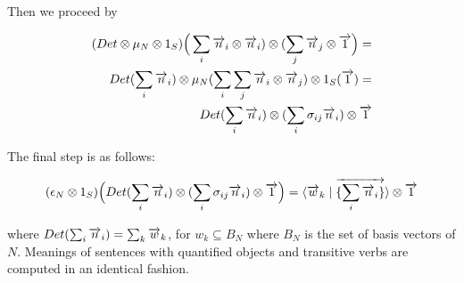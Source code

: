 \noindent
Then we proceed by

\begin{align*}
(Det \otimes  \mu_N \otimes 1_S)\Big(\sum_i \overrightarrow{n}_i \otimes \overrightarrow{n}_i) \otimes (\sum_j \overrightarrow{n}_j \otimes \overrightarrow{1}\Big) = \\
Det(\sum_i \overrightarrow{n}_i) \otimes  \mu_N(\sum_i \sum_j \overrightarrow{n}_i \otimes \overrightarrow{n}_j) \otimes 1_S(\overrightarrow{1}) = \\
Det(\sum_i \overrightarrow{n}_i) \otimes  (\sum_i \sigma_{ij} \overrightarrow{n}_i) \otimes \overrightarrow{1} 
\end{align*}

\noindent
The final step is as follows:

\begin{align*}
(\epsilon_{N} \otimes 1_S)  \Big(Det(\sum_i \overrightarrow{n}_i) \otimes (\sum_i \sigma_{ij} \overrightarrow{n}_i) \otimes \overrightarrow{1} \Big) =   \langle \overrightarrow{w}_k \mid \overrightarrow{\{\sum_i \overrightarrow{n}_i\}} \rangle  \otimes \overrightarrow{1}
\end{align*}

\noindent 
where $Det (\sum_i \overrightarrow{n}_i) = \sum_k \overrightarrow{w}_k$, for $w_k \subseteq B_N$ where $B_N$ is the set of basis vectors of $N$.  Meanings of sentences with quantified objects and transitive verbs are computed in an identical fashion. 




